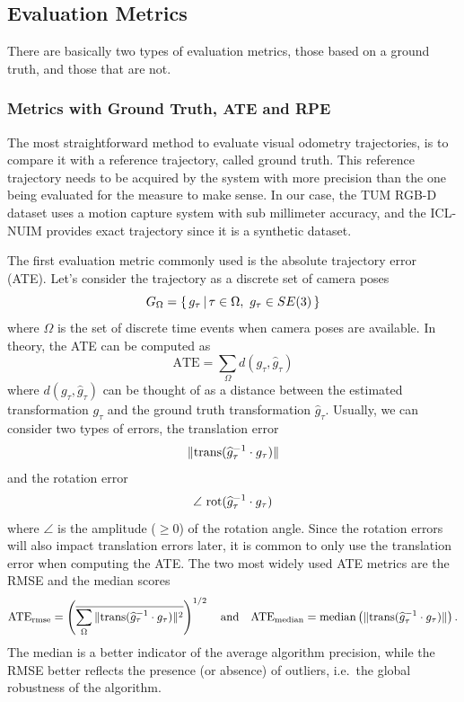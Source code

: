 \subsection{Evaluation Metrics}%
\label{sub:metrics}

There are basically two types of evaluation metrics,
those based on a ground truth, and those that are not.

\subsubsection{Metrics with Ground Truth, ATE and RPE}%
\label{ssub:metrics_gt}

The most straightforward method to evaluate visual odometry trajectories,
is to compare it with a reference trajectory, called ground truth.
This reference trajectory needs to be acquired by the system with more precision
than the one being evaluated for the measure to make sense.
In our case, the TUM RGB-D dataset uses a motion capture system with sub millimeter accuracy,
and the ICL-NUIM provides exact trajectory since it is a synthetic dataset.

The first evaluation metric commonly used is the absolute trajectory error (ATE).
Let's consider the trajectory as a discrete set of camera poses
\[
	G_{\Omega} = \left\{\, {g_{\tau}} \, \middle| \, {\tau \in \Omega,\ g_{\tau} \in SE(3)} \,\right\}
\]
where $\Omega$ is the set of discrete time events when camera poses are available.
In theory, the ATE can be computed as
\[
	\text{ATE} = \sum_{\Omega} d(g_{\tau}, \widehat{g}_{\tau})
\]
where $d(g_{\tau}, \widehat{g}_{\tau})$ can be thought of
as a distance between the estimated transformation $g_{\tau}$
and the ground truth transformation $\widehat{g}_{\tau}$.
Usually, we can consider two types of errors, the translation error
\[
	\| \text{trans}(\widehat{g}_{\tau}^{-1} \cdot g_{\tau}) \|
\]
and the rotation error
\[
	\angle\ \text{rot}(\widehat{g}_{\tau}^{-1} \cdot g_{\tau})
\]
where $\angle$ is the amplitude ($\geq 0$) of the rotation angle.
Since the rotation errors will also impact translation errors later,
it is common to only use the translation error when computing the ATE.
The two most widely used ATE metrics are the RMSE and the median scores
\[
	\text{ATE}_{\text{rmse}} =
		\left( \overline{ \sum_{\Omega} \| \text{trans}(\widehat{g}_{\tau}^{-1} \cdot g_{\tau}) \|^2 }
		\right)^{1/2}
	\quad \text{and} \quad
	\text{ATE}_{\text{median}} =
		\text{median} \left( \| \text{trans}(\widehat{g}_{\tau}^{-1} \cdot g_{\tau}) \| \right).
\]
The median is a better indicator of the average algorithm precision,
while the RMSE better reflects the presence (or absence) of outliers,
i.e.\ the global robustness of the algorithm.

